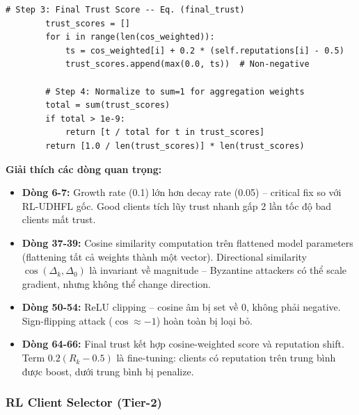 \documentclass[12pt,a4paper]{article}
\begin{document}
\begin{lstlisting}[caption=FLTrust with Temporal Reputation, label=lst:fltrust]
        # Step 3: Final Trust Score -- Eq. (final_trust)
        trust_scores = []
        for i in range(len(cos_weighted)):
            ts = cos_weighted[i] + 0.2 * (self.reputations[i] - 0.5)
            trust_scores.append(max(0.0, ts))  # Non-negative

        # Step 4: Normalize to sum=1 for aggregation weights
        total = sum(trust_scores)
        if total > 1e-9:
            return [t / total for t in trust_scores]
        return [1.0 / len(trust_scores)] * len(trust_scores)
\end{lstlisting}

\textbf{Giải thích các dòng quan trọng:}
\begin{itemize}
    \item \textbf{Dòng 6-7:} Growth rate (0.1) lớn hơn decay rate (0.05) -- critical fix so với RL-UDHFL gốc. Good clients tích lũy trust nhanh gấp 2 lần tốc độ bad clients mất trust.
    \item \textbf{Dòng 37-39:} Cosine similarity computation trên flattened model parameters (flattening tất cả weights thành một vector). Directional similarity $\cos(\Delta_k, \Delta_0)$ là invariant về magnitude -- Byzantine attackers có thể scale gradient, nhưng không thể change direction.
    \item \textbf{Dòng 50-54:} ReLU clipping -- cosine âm bị set về 0, không phải negative. Sign-flipping attack ($\cos \approx -1$) hoàn toàn bị loại bỏ.
    \item \textbf{Dòng 64-66:} Final trust kết hợp cosine-weighted score và reputation shift. Term $0.2(R_k - 0.5)$ là fine-tuning: clients có reputation trên trung bình được boost, dưới trung bình bị penalize.
\end{itemize}

\subsubsection{RL Client Selector (Tier-2)}
\end{document}

